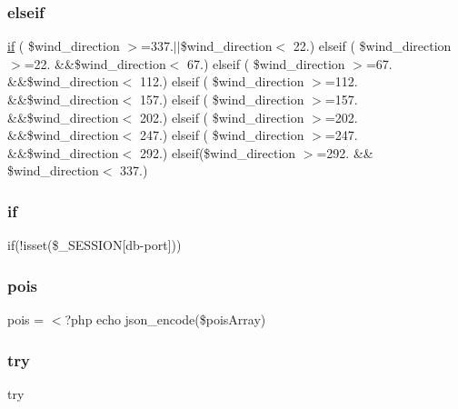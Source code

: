 \subsubsection{\texorpdfstring{elseif}{elseif}}
{\footnotesize\ttfamily \mbox{\hyperlink{hull_2index_8php_a8f0d8893361d6307986497540738a8bf}{if}} ( \$wind\+\_\+direction $>$=337.$\vert$$\vert$\$wind\+\_\+direction$<$ 22.) elseif ( \$wind\+\_\+direction $>$=22. \&\&\$wind\+\_\+direction$<$ 67.) elseif ( \$wind\+\_\+direction $>$=67. \&\&\$wind\+\_\+direction$<$ 112.) elseif ( \$wind\+\_\+direction $>$=112. \&\&\$wind\+\_\+direction$<$ 157.) elseif ( \$wind\+\_\+direction $>$=157. \&\&\$wind\+\_\+direction$<$ 202.) elseif ( \$wind\+\_\+direction $>$=202. \&\&\$wind\+\_\+direction$<$ 247.) elseif ( \$wind\+\_\+direction $>$=247. \&\&\$wind\+\_\+direction$<$ 292.) elseif(\$wind\+\_\+direction $>$=292. \&\& \$wind\+\_\+direction$<$ 337.)}

\mbox{\label{hull_2index_8php_a8f0d8893361d6307986497540738a8bf}} 
\subsubsection{\texorpdfstring{if}{if}}
{\footnotesize\ttfamily if(!isset(\$\+\_\+\+S\+E\+S\+S\+I\+ON\mbox{[}\textquotesingle{}db-\/port\textquotesingle{}\mbox{]}))}

\mbox{\label{hull_2index_8php_a6a514fba2a6c59dcbdb65a73e7c76f73}} 
\subsubsection{\texorpdfstring{pois}{pois}}
{\footnotesize\ttfamily pois = $<$?php echo json\+\_\+encode(\$pois\+Array)}

\mbox{\label{hull_2index_8php_abe4cc9788f52e49485473dc699537388}} 
\subsubsection{\texorpdfstring{try}{try}}
{\footnotesize\ttfamily try}

